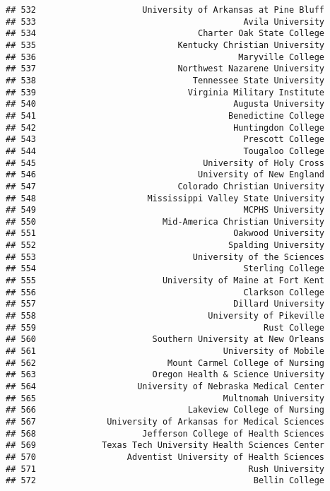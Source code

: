 \documentclass[
]{article}
\begin{document}
\begin{verbatim}
## 532                     University of Arkansas at Pine Bluff
## 533                                         Avila University
## 534                                Charter Oak State College
## 535                            Kentucky Christian University
## 536                                        Maryville College
## 537                            Northwest Nazarene University
## 538                               Tennessee State University
## 539                              Virginia Military Institute
## 540                                       Augusta University
## 541                                      Benedictine College
## 542                                       Huntingdon College
## 543                                         Prescott College
## 544                                         Tougaloo College
## 545                                 University of Holy Cross
## 546                                University of New England
## 547                            Colorado Christian University
## 548                      Mississippi Valley State University
## 549                                         MCPHS University
## 550                         Mid-America Christian University
## 551                                       Oakwood University
## 552                                      Spalding University
## 553                               University of the Sciences
## 554                                         Sterling College
## 555                         University of Maine at Fort Kent
## 556                                         Clarkson College
## 557                                       Dillard University
## 558                                  University of Pikeville
## 559                                             Rust College
## 560                       Southern University at New Orleans
## 561                                     University of Mobile
## 562                          Mount Carmel College of Nursing
## 563                       Oregon Health & Science University
## 564                    University of Nebraska Medical Center
## 565                                     Multnomah University
## 566                              Lakeview College of Nursing
## 567              University of Arkansas for Medical Sciences
## 568                     Jefferson College of Health Sciences
## 569             Texas Tech University Health Sciences Center
## 570                  Adventist University of Health Sciences
## 571                                          Rush University
## 572                                           Bellin College

\end{verbatim}
\end{document}
